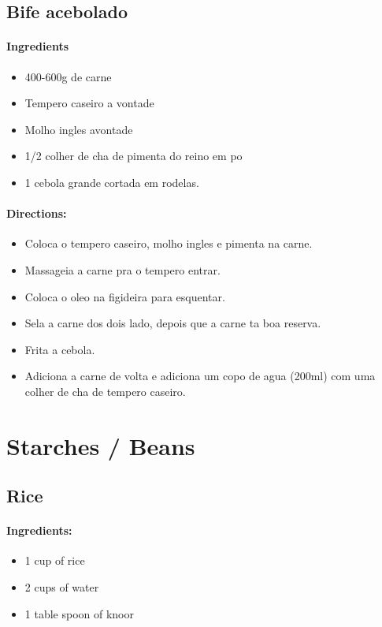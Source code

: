 \documentclass{article}
\begin{document}
\subsection{Bife acebolado}

\paragraph{Ingredients}
\begin{itemize}
	\item 400-600g de carne
	\item Tempero caseiro a vontade
	\item Molho ingles  avontade
	\item 1/2 colher de cha de pimenta do reino em po
	\item 1 cebola grande cortada em rodelas.
\end{itemize}

\paragraph{Directions:}
\begin{itemize}
	\item Coloca o tempero caseiro, molho ingles e pimenta na carne. 
	\item Massageia a carne pra o tempero entrar.
	\item Coloca o oleo na figideira para esquentar.
	\item Sela a carne dos dois lado, depois que a carne ta boa reserva.
	\item Frita a cebola.
	\item Adiciona a carne de volta e adiciona um copo de agua (200ml) com uma colher de cha de tempero caseiro.
\end{itemize}

\section{Starches / Beans}

\subsection{Rice}

\paragraph{Ingredients:}

\begin{itemize}
	\item 1 cup of rice
	\item 2 cups of water
	\item 1 table spoon of knoor
\end{itemize}
\end{document}
